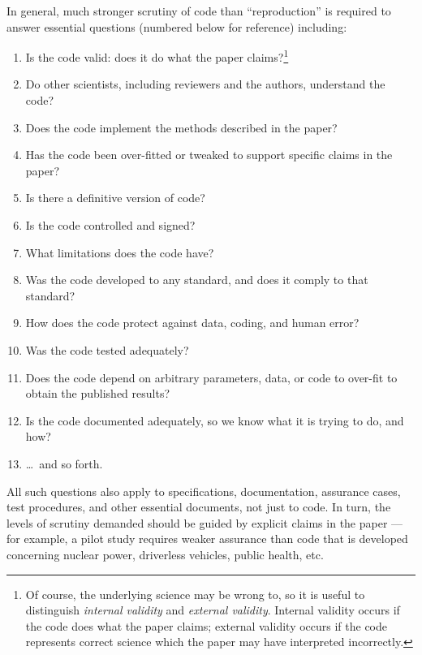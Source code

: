 \documentclass{comjnl}
\begin{document}
In general, much stronger scrutiny of code than ``reproduction'' is required to answer essential questions (numbered below for reference) including:

\newcount \enum
{}
\renewcommand{\theenumi}{\ifnum \enum<10 \hphantom{0}\fi
\the\enum
\global\advance \enum by 1}
\begin{enumerate}\raggedright
\item Is the code valid: does it do what the paper claims?\footnote{Of course, the underlying science may be wrong to, so it is useful to distinguish \emph{internal validity\/} and \emph{external validity}. Internal validity occurs if the code does what the paper claims; external validity occurs if the code represents correct science which the paper may have interpreted incorrectly.}
\item Do other scientists, including reviewers and the authors, understand the code?
\item Does the code implement the methods described in the paper?
\item Has the code been over-fitted or tweaked to support specific claims in the paper?
\item Is there a definitive version of code?
\item Is the code controlled and signed?
\item What limitations does the code have?
\item Was the code developed to any standard, and does it comply to that standard?
\item How does the code protect against data, coding, and human error?
\item Was the code tested adequately?
\item Does the code depend on arbitrary parameters, data, or code to over-fit to obtain the published results?
\item Is the code documented adequately, so we know what it is trying to do, and how?
\item \ldots\ and so forth. 
\end{enumerate}

All such questions also apply to specifications, documentation, assurance cases, test procedures, and other essential documents, not just to code. In turn, the levels of scrutiny demanded should be guided by explicit claims in the paper \cite{essence-of-software} --- for example, a pilot study requires weaker assurance than code that is developed concerning nuclear power, driverless vehicles, public health, etc. 
\end{document}
